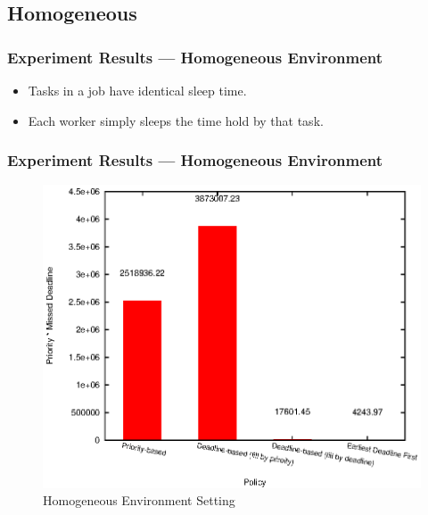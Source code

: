 \subsection{Homogeneous}
\begin{frame}
  \frametitle{Experiment Results --- Homogeneous Environment}
  \begin{itemize}
    \item Tasks in a job have identical sleep time.
    \item Each worker simply sleeps the time hold by that task.
  \end{itemize}
\end{frame}

\begin{frame}
  \frametitle{Experiment Results --- Homogeneous Environment}
  \begin{figure}[htbp]
    \centering
    \includegraphics[width=\textwidth,height=0.7\textheight,keepaspectratio]{figures/homo.eps}
    \caption{Homogeneous Environment Setting}
    \label{fig:homo-exp}
  \end{figure}
\end{frame}

